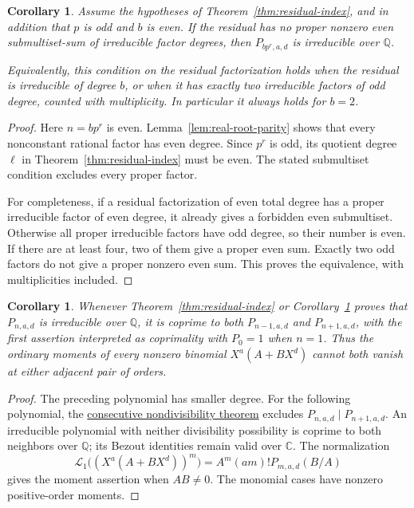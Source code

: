 \documentclass[11pt]{article}
\newtheorem{corollary}[theorem]{Corollary}
\newcommand{\Q}{\mathbb Q}
\begin{document}
\begin{corollary}\label{cor:parity-residual}
Assume the hypotheses of Theorem~\ref{thm:residual-index}, and in addition
that $p$ is odd and $b$ is even. If the residual has no proper nonzero
even submultiset-sum of irreducible factor degrees, then
$P_{bp^r,a,d}$ is irreducible over $\Q$.

Equivalently, this condition on the residual factorization holds when
the residual is irreducible of degree $b$, or when it has exactly two
irreducible factors of odd degree, counted with multiplicity.
In particular it always holds for $b=2$.
\end{corollary}
\begin{proof}
Here $n=bp^r$ is even. Lemma~\ref{lem:real-root-parity} shows that
every nonconstant rational factor has even degree.
Since $p^r$ is odd, its quotient degree $\ell$ in Theorem~\ref{thm:residual-index}
must be even. The stated submultiset condition excludes every
proper factor.

For completeness, if a residual factorization of even total degree
has a proper irreducible factor of even degree, it already gives a
forbidden even submultiset. Otherwise all proper irreducible factors
have odd degree, so their number is even. If there are at least four,
two of them give a proper even sum. Exactly two odd factors do not
give a proper nonzero even sum. This proves the equivalence, with
multiplicities included.
\end{proof}

\begin{corollary}\label{cor:residual-adjacent-pairs}
Whenever Theorem~\ref{thm:residual-index} or
Corollary~\ref{cor:parity-residual} proves that $P_{n,a,d}$ is
irreducible over $\mathbb Q$, it is coprime to both
$P_{n-1,a,d}$ and $P_{n+1,a,d}$, with the first assertion
interpreted as coprimality with $P_0=1$ when $n=1$.
Thus the ordinary moments of every nonzero binomial
$X^a(A+BX^d)$ cannot both vanish at either adjacent pair of orders.
\end{corollary}
\begin{proof}
The preceding polynomial has smaller degree.
For the following polynomial, the
\href{BINOMIAL_IRREDUCIBILITY_REDUCTION.tex}{consecutive
nondivisibility theorem} excludes $P_{n,a,d}\mid P_{n+1,a,d}$.
An irreducible polynomial with neither divisibility possibility
is coprime to both neighbors over $\mathbb Q$; its Bezout identities
remain valid over $\mathbb C$.
The normalization
\[
 \mathcal L_1\bigl((X^a(A+BX^d))^m\bigr)
 = A^m(am)!P_{m,a,d}(B/A)
\]
gives the moment assertion when $AB\ne0$.
The monomial cases have nonzero positive-order moments.
\end{proof}
\end{document}
